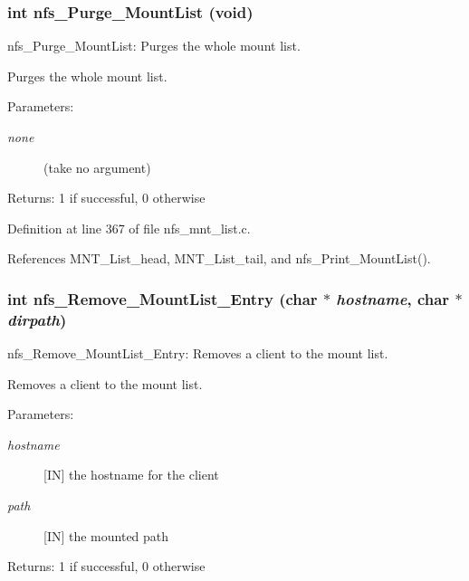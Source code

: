 \subsubsection{\setlength{\rightskip}{0pt plus 5cm}int nfs\_\-Purge\_\-Mount\-List (void)}\label{nfs__mnt__list_8c_a4}


nfs\_\-Purge\_\-Mount\-List: Purges the whole mount list.

Purges the whole mount list.

\begin{Desc}
\item[Parameters:]
\begin{description}
\item[{\em none}](take no argument)\end{description}
\end{Desc}
\begin{Desc}
\item[Returns:]1 if successful, 0 otherwise \end{Desc}


Definition at line 367 of file nfs\_\-mnt\_\-list.c.

References MNT\_\-List\_\-head, MNT\_\-List\_\-tail, and nfs\_\-Print\_\-Mount\-List().
\subsubsection{\setlength{\rightskip}{0pt plus 5cm}int nfs\_\-Remove\_\-Mount\-List\_\-Entry (char $\ast$ {\em hostname}, char $\ast$ {\em dirpath})}\label{nfs__mnt__list_8c_a3}


nfs\_\-Remove\_\-Mount\-List\_\-Entry: Removes a client to the mount list.

Removes a client to the mount list.

\begin{Desc}
\item[Parameters:]
\begin{description}
\item[{\em hostname}][IN] the hostname for the client \item[{\em path}][IN] the mounted path\end{description}
\end{Desc}
\begin{Desc}
\item[Returns:]1 if successful, 0 otherwise \end{Desc}



